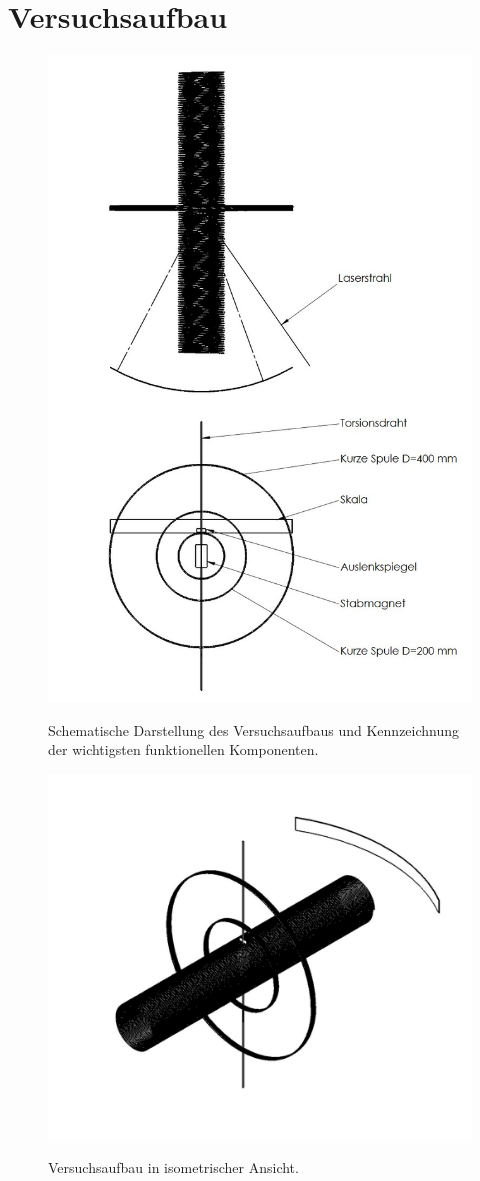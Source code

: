 \chapter{Versuchsaufbau}
\begin{figure}[ht]
    \centering
    \includegraphics[width=.71\textwidth]{assets/Aufbau.jpg}
    \label{fig:aufbau}
    \caption[Versuchsaufbau]{Schematische Darstellung des Versuchsaufbaus und Kennzeichnung der wichtigsten funktionellen Komponenten.}
\end{figure}

\begin{figure}[ht]
    \centering
    \includegraphics[width=\textwidth]{assets/Aufbau_isometrisch.jpg}
    \label{fig:aufbau_iso}
    \caption[Versuchsaufbau - isometrisch]{Versuchsaufbau in isometrischer Ansicht.}
\end{figure}